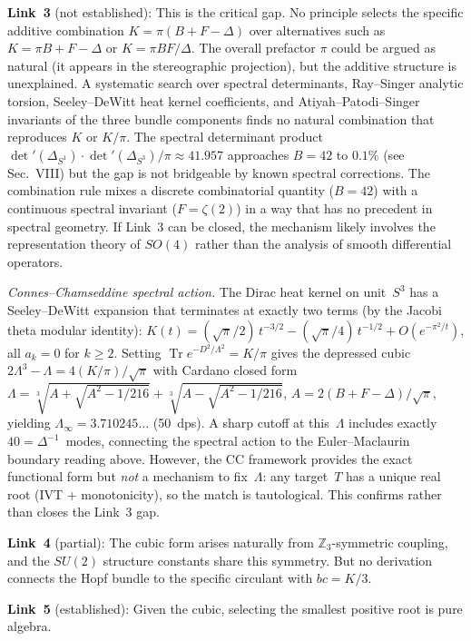 \documentclass[aps,prl,twocolumn,superscriptaddress]{revtex4-2}
\begin{document}
\textbf{Link~3} (not established): This is the critical gap. No
principle selects the specific additive combination
$K = \pi(B + F - \Delta)$ over alternatives such as
$K = \pi B + F - \Delta$ or $K = \pi B F / \Delta$. The overall
prefactor $\pi$ could be argued as natural (it appears in the
stereographic projection), but the additive structure is unexplained.
A systematic search over spectral determinants, Ray--Singer analytic
torsion, Seeley--DeWitt heat kernel coefficients, and
Atiyah--Patodi--Singer invariants of the three bundle components finds
no natural combination that reproduces $K$ or $K/\pi$. The spectral
determinant product
$\det'(\Delta_{S^1}) \cdot \det'(\Delta_{S^3})/\pi \approx 41.957$
approaches $B = 42$ to $0.1\%$ (see Sec.~VIII) but the gap is not
bridgeable by known spectral corrections. The combination rule mixes a
discrete combinatorial quantity ($B = 42$) with a continuous spectral
invariant ($F = \zeta(2)$) in a way that has no precedent in spectral
geometry. If Link~3 can be closed, the mechanism likely involves the
representation theory of $SO(4)$ rather than the analysis of smooth
differential operators.

\textit{Connes--Chamseddine spectral action.}
The Dirac heat kernel on unit~$S^3$ has a Seeley--DeWitt expansion
that terminates at exactly two terms (by the Jacobi theta modular
identity): $K(t) = (\sqrt{\pi}/2)\,t^{-3/2}
- (\sqrt{\pi}/4)\,t^{-1/2} + O(e^{-\pi^2/t})$, all $a_k = 0$ for
$k \geq 2$.  Setting
$\operatorname{Tr} e^{-D^2/\Lambda^2} = K/\pi$ gives the depressed
cubic $2\Lambda^3 - \Lambda = 4(K/\pi)/\sqrt{\pi}$ with Cardano
closed form
$\Lambda = \sqrt[3]{A + \sqrt{A^2 - 1/216}}
+ \sqrt[3]{A - \sqrt{A^2 - 1/216}}$,
$A = 2(B + F - \Delta)/\sqrt{\pi}$, yielding
$\Lambda_\infty = 3.710245\ldots$ (50~dps).
A sharp cutoff at this~$\Lambda$ includes exactly
$40 = \Delta^{-1}$~modes, connecting the spectral action to the
Euler--Maclaurin boundary reading above.  However, the CC framework
provides the exact functional form but \emph{not} a mechanism to
fix~$\Lambda$: any target~$T$ has a unique real root (IVT +
monotonicity), so the match is tautological.  This confirms
rather than closes the Link~3 gap.

\textbf{Link~4} (partial): The cubic form arises naturally from
$\mathbb{Z}_3$-symmetric coupling, and the $SU(2)$ structure constants
share this symmetry. But no derivation connects the Hopf bundle to the
specific circulant with $bc = K/3$.

\textbf{Link~5} (established): Given the cubic, selecting the smallest
positive root is pure algebra.
\end{document}
